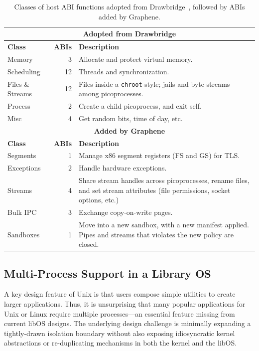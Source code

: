 \begin{table}[t!b!]
\footnotesize
\centering
\begin{tabular}{|l|r|p{3.9in}|}
\hline
\multicolumn{3}{|c|}{\bf Adopted from Drawbridge} \\
\hline
{\bf Class} & {\bf ABIs} & {\bf Description} \\
\hline
Memory & 3 & Allocate and protect virtual memory. \\
\hline
Scheduling & 12 & Threads and synchronization. \\
\hline
Files \&  Streams & 12 & Files inside a {\tt chroot}-style; jails and byte streams among picoprocesses. \\
\hline
Process & 2 & Create a child picoprocess, and exit self. \\
\hline
Misc & 4 & Get random bits, time of day, etc. \\ %
\hline
\multicolumn{3}{|c|}{\bf Added by Graphene} \\
\hline
{\bf Class} & {\bf ABIs} & {\bf Description} \\
\hline
Segments & 1 & Manage x86 segment registers (FS and GS) for TLS. \\
\hline
Exceptions & 2 & Handle hardware exceptions. \\
\hline
Streams & 4 & Share stream handles across picoprocesses, rename files, and set stream attributes (file permissions, socket options, etc.) \\
\hline
Bulk IPC & 3 & Exchange copy-on-write pages.\\
\hline
Sandboxes & 1 & Move into a new sandbox, with a new manifest applied. Pipes and streams that violates the new policy are closed.\\
\hline
\end{tabular}
\caption{Classes of 
host ABI functions adopted from Drawbridge~\cite{porter11drawbridge}, 
followed by ABIs added by Graphene.}
\label{tab:abi}
\end{table}



\subsection{Multi-Process Support in a Library OS}

A key design feature of Unix is that users compose simple utilities to create
larger applications.  Thus, it is unsurprising that many popular applications for Unix or Linux
require multiple processes---an essential feature missing from current libOS designs.
The underlying design challenge is minimally expanding 
a tightly-drawn isolation boundary
without also exposing idiosyncratic kernel abstractions or
re-duplicating mechanisms in both the kernel and the libOS.

